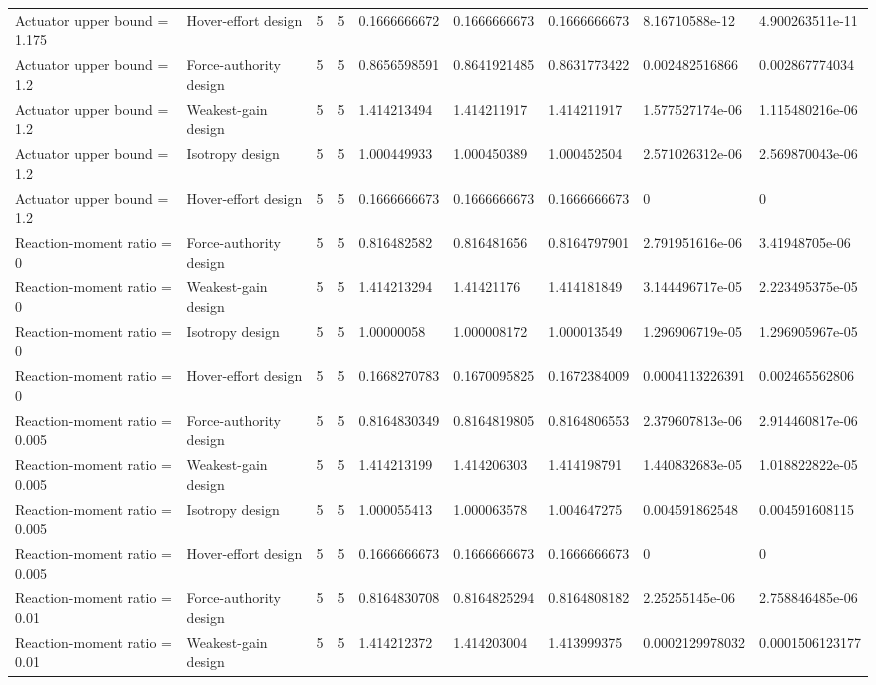 \begin{tabular}{@{}lllllllll@{}}
Actuator upper bound = 1.175 & Hover-effort design & 5 & 5 & 0.1666666672 & 0.1666666673 & 0.1666666673 & 8.16710588e-12 & 4.900263511e-11 \\
Actuator upper bound = 1.2 & Force-authority design & 5 & 5 & 0.8656598591 & 0.8641921485 & 0.8631773422 & 0.002482516866 & 0.002867774034 \\
Actuator upper bound = 1.2 & Weakest-gain design & 5 & 5 & 1.414213494 & 1.414211917 & 1.414211917 & 1.577527174e-06 & 1.115480216e-06 \\
Actuator upper bound = 1.2 & Isotropy design & 5 & 5 & 1.000449933 & 1.000450389 & 1.000452504 & 2.571026312e-06 & 2.569870043e-06 \\
Actuator upper bound = 1.2 & Hover-effort design & 5 & 5 & 0.1666666673 & 0.1666666673 & 0.1666666673 & 0 & 0 \\
Reaction-moment ratio = 0 & Force-authority design & 5 & 5 & 0.816482582 & 0.816481656 & 0.8164797901 & 2.791951616e-06 & 3.41948705e-06 \\
Reaction-moment ratio = 0 & Weakest-gain design & 5 & 5 & 1.414213294 & 1.41421176 & 1.414181849 & 3.144496717e-05 & 2.223495375e-05 \\
Reaction-moment ratio = 0 & Isotropy design & 5 & 5 & 1.00000058 & 1.000008172 & 1.000013549 & 1.296906719e-05 & 1.296905967e-05 \\
Reaction-moment ratio = 0 & Hover-effort design & 5 & 5 & 0.1668270783 & 0.1670095825 & 0.1672384009 & 0.0004113226391 & 0.002465562806 \\
Reaction-moment ratio = 0.005 & Force-authority design & 5 & 5 & 0.8164830349 & 0.8164819805 & 0.8164806553 & 2.379607813e-06 & 2.914460817e-06 \\
Reaction-moment ratio = 0.005 & Weakest-gain design & 5 & 5 & 1.414213199 & 1.414206303 & 1.414198791 & 1.440832683e-05 & 1.018822822e-05 \\
Reaction-moment ratio = 0.005 & Isotropy design & 5 & 5 & 1.000055413 & 1.000063578 & 1.004647275 & 0.004591862548 & 0.004591608115 \\
Reaction-moment ratio = 0.005 & Hover-effort design & 5 & 5 & 0.1666666673 & 0.1666666673 & 0.1666666673 & 0 & 0 \\
Reaction-moment ratio = 0.01 & Force-authority design & 5 & 5 & 0.8164830708 & 0.8164825294 & 0.8164808182 & 2.25255145e-06 & 2.758846485e-06 \\
Reaction-moment ratio = 0.01 & Weakest-gain design & 5 & 5 & 1.414212372 & 1.414203004 & 1.413999375 & 0.0002129978032 & 0.0001506123177 \\

\end{tabular}
